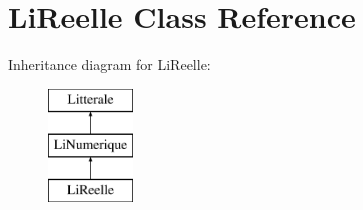 \hypertarget{class_li_reelle}{}\section{Li\+Reelle Class Reference}
\label{class_li_reelle}
Inheritance diagram for Li\+Reelle\+:\begin{figure}[H]
\begin{center}
\leavevmode
\includegraphics[height=3.000000cm]{class_li_reelle}
\end{center}
\end{figure}
